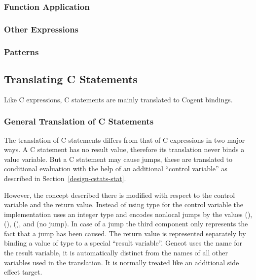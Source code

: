 \subsubsection{Function Application}

\subsubsection{Other Expressions}

\subsubsection{Patterns}

\subsection{Translating C Statements}
\label{impl-ccode-cstats}

Like C expressions, C statements are mainly translated to Cogent bindings.

\subsubsection{General Translation of C Statements}

The translation of C statements differs from that of C expressions in two major ways. A C statement has no result 
value, therefore its translation never binds a value variable. But a C statement may cause jumps, these are translated
to conditional evaluation with the help of an additional ``control variable''  as described in 
Section~\ref{design-cstats-stat}.

However, the concept described there is modified with respect to the control variable and the return value. Instead of using type  for the control variable the implementation uses an integer type and encodes nonlocal jumps by the 
values  (),  (),  (), and  (no jump). In case 
of a  jump the third component only represents the fact that a jump has been caused. The return value is represented 
separately by binding a value of type  to a special ``result variable''. Gencot uses the name  for the 
result variable, it is automatically distinct from the names of all other variables used in the translation. It is
normally treated like an additional side effect target.

